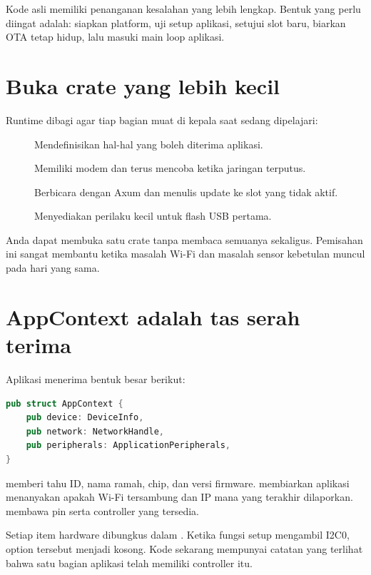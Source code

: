 Kode asli memiliki penanganan kesalahan yang lebih lengkap. Bentuk yang perlu diingat adalah: siapkan platform, uji setup aplikasi, setujui slot baru, biarkan OTA tetap hidup, lalu masuki main loop aplikasi.

\section{Buka crate yang lebih kecil}

Runtime dibagi agar tiap bagian muat di kepala saat sedang dipelajari:

\begin{description}
  \item[] Mendefinisikan hal-hal yang boleh diterima aplikasi.
  \item[] Memiliki modem dan terus mencoba ketika jaringan terputus.
  \item[] Berbicara dengan Axum dan menulis update ke slot yang tidak aktif.
  \item[] Menyediakan perilaku kecil untuk flash USB pertama.
\end{description}

Anda dapat membuka satu crate tanpa membaca semuanya sekaligus. Pemisahan ini sangat membantu ketika masalah Wi-Fi dan masalah sensor kebetulan muncul pada hari yang sama.

\section{AppContext adalah tas serah terima}

Aplikasi menerima bentuk besar berikut:

\begin{lstlisting}[language=Rust]
pub struct AppContext {
    pub device: DeviceInfo,
    pub network: NetworkHandle,
    pub peripherals: ApplicationPeripherals,
}
\end{lstlisting}

 memberi tahu ID, nama ramah, chip, dan versi firmware.  membiarkan aplikasi menanyakan apakah Wi-Fi tersambung dan IP mana yang terakhir dilaporkan.  membawa pin serta controller yang tersedia.

Setiap item hardware dibungkus dalam . Ketika fungsi setup mengambil I2C0, option tersebut menjadi kosong. Kode sekarang mempunyai catatan yang terlihat bahwa satu bagian aplikasi telah memiliki controller itu.

